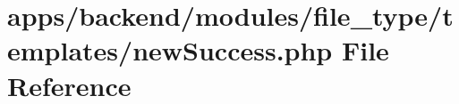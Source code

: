 \hypertarget{backend_2modules_2file__type_2templates_2new_success_8php}{\section{apps/backend/modules/file\-\_\-type/templates/new\-Success.php File Reference}
\label{backend_2modules_2file__type_2templates_2new_success_8php}
}
